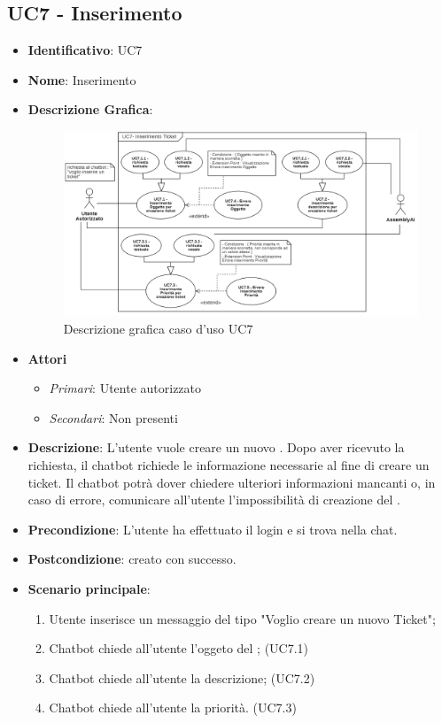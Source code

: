 \subsection{UC7 - Inserimento }
\begin{itemize}
	\item \textbf{Identificativo}: UC7
	\item \textbf{Nome}: Inserimento 
	\item\textbf{Descrizione Grafica}: 
	

	\begin{figure}[h]
        \centering
        \includegraphics[scale=0.50]{images/UC7.png} 
        \caption{Descrizione grafica caso d'uso UC7}
    \end{figure}

	\item \textbf{Attori}
	\begin{itemize} 
		\item \textit{Primari}: Utente autorizzato
		\item \textit{Secondari}: Non presenti 
	\end{itemize}
	\item \textbf{Descrizione}: L'utente vuole creare un nuovo . Dopo aver ricevuto la richiesta, il chatbot richiede le informazione necessarie al fine di creare un ticket. Il chatbot potrà dover chiedere ulteriori informazioni mancanti o, in caso di errore, comunicare all'utente l'impossibilità di creazione del .
	\item \textbf{Precondizione}: L'utente ha effettuato il login e si trova nella chat.
	\item \textbf{Postcondizione}:  creato con successo.
	\item \textbf{Scenario principale}: \begin{enumerate}
		\item Utente inserisce un messaggio del tipo "Voglio creare un nuovo Ticket";
		\item Chatbot chiede all'utente l'oggeto del ; (UC7.1)
    \item Chatbot chiede all'utente la descrizione; (UC7.2)
		\item Chatbot chiede all'utente la priorità. (UC7.3)
	\end{enumerate}
\end{itemize}


